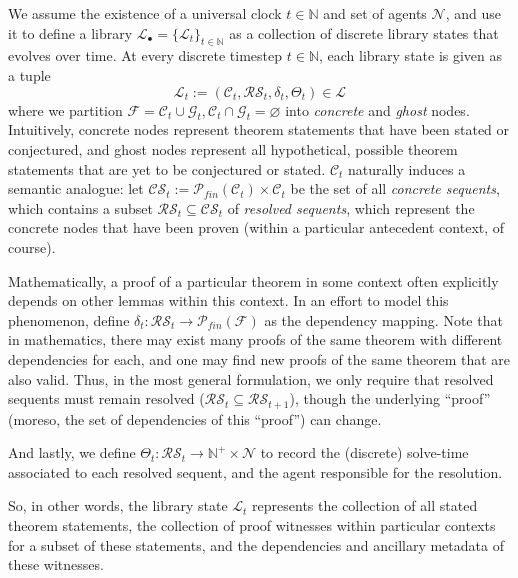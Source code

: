 We assume the existence of a universal clock $t \in \mathbb N$ and set of agents $\mathcal N$, and use it to define a library $\mathcal{L}_\bullet = \{\mathcal{L}_t\}_{t \in \mathbb{N}}$ as a collection of discrete library states that evolves over time. At every discrete timestep $t \in \mathbb{N}$, each library state is given as a tuple 
\[\mathcal{L}_t := (\mathcal{C}_t,\mathcal{RS}_t, \delta_t, \Theta_t) \in \mathscr{L}\]
where we partition $\mathcal{F} = \mathcal{C}_t \cup \mathcal{G}_t, \mathcal{C}_t \cap \mathcal{G}_t = \varnothing$ into \textit{concrete} and \textit{ghost} nodes. Intuitively, concrete nodes represent theorem statements that have been stated or conjectured, and ghost nodes represent all hypothetical, possible theorem statements that are yet to be conjectured or stated. $\mathcal{C}_t$ naturally induces a semantic analogue: let $\mathcal{CS}_t := \mathcal{P}_{fin}(\mathcal{C}_t) \times \mathcal{C}_t$ be the set of all \textit{concrete sequents}, which contains a subset $\mathcal{RS}_t \subseteq \mathcal{CS}_t$ of \textit{resolved sequents}, which represent the concrete nodes that have been proven (within a particular antecedent context, of course). 


Mathematically, a proof of a particular theorem in some context often explicitly depends on other lemmas within this context. In an effort to model this phenomenon, define $\delta_t : \mathcal{RS}_t \to \mathcal{P}_{fin}(\mathcal{F})$ as the dependency mapping.
Note that in mathematics, there may exist many proofs of the same theorem with different dependencies for each, and one may find new proofs of the same theorem that are also valid. Thus, in the most general formulation, we only require that resolved sequents must remain resolved ($\mathcal{RS}_{t} \subseteq \mathcal{RS}_{t+1}$), though the underlying ``proof'' (moreso, the set of dependencies of this ``proof'') can change.

And lastly, we define $\Theta_t : \mathcal{RS}_t\to\mathbb N^+ \times \mathcal N$ to record the (discrete) solve-time associated to each resolved sequent, and the agent responsible for the resolution. 


So, in other words, the library state $\mathcal{L}_t$ represents the collection of all stated theorem statements, the collection of proof witnesses within particular contexts for a subset of these statements, and the dependencies and ancillary metadata of these witnesses.

